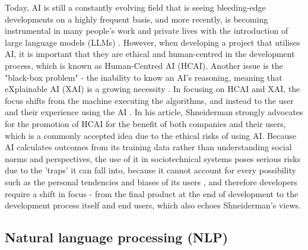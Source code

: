 \documentclass[12pt]{report}
\begin{document}
    Today, AI is still a constantly evolving field that is seeing bleeding-edge developments on a 
    highly frequent basis, and more recently, is becoming instrumental in many people's work and private lives 
    with the introduction of large language models (LLMs) \autocite{AIDigitalAssistants}.
    However, when developing a project that utilises AI, it is important that 
    they are ethical and human-centred in the development process, which is known as Human-Centred AI (HCAI). 
    Another issue is the "black-box problem" - the inability to know an AI's reasoning, meaning that 
    eXplainable AI (XAI) is a growing necessity \autocite{miro-nicolau_comprehensive_2025}. In focusing on 
    HCAI and XAI, the focus shifts from the machine executing the algorithms, and instead to the user and their experience 
    using the AI \autocite{AIEthics}. In his article, Shneiderman strongly advocates for the 
    promotion of HCAI for the benefit of both companies and their users, which is a commonly accepted 
    idea due to the ethical risks of using AI. Because AI calculates outcomes from its training data rather 
    than understanding social norms and perspectives, the use of it in sociotechnical systems poses serious risks 
    due to the 'traps' it can fall into, because it cannot account for every possibility such as the personal tendencies 
    and biases of its users \autocite{selbst_fairness_2019}, and therefore developers require a shift in focus - from the final product
    at the end of development to the development process itself and end users, which also echoes Shneiderman's views. 

    \subsection{Natural language processing (NLP)}

\end{document}
